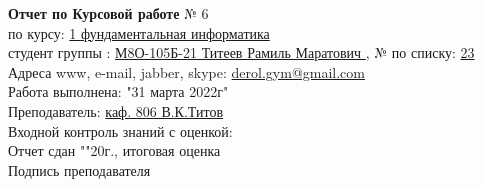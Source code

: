\documentclass[10pt]{report}
\begin{document}
    \begin{spacing}{1.7}
        \hspace{1.2in}
        \textbf {Отчет по Курсовой работе} № 6\\     %
        \indent \hspace{1.2in} по курсу: \underline{1 фундаментальная информатика } \\
        \indent \hspace{1.2in} студент группы : \underline{М8О-105Б-21 Титеев Рамиль Маратович }, № по списку: \underline{ 23 } \\
        \indent \hspace{1.2in} Адреса www, e-mail, jabber, skype: \underline{ derol.gym@gmail.com } \\
        \indent \hspace{1.2in} Работа выполнена: "31 марта 2022г" \\   %
        \indent \hspace{1.2in} Преподаватель: \underline{ каф. 806 В.К.Титов} \\
        \indent \hspace{1.2in} Входной контроль знаний с оценкой: \tlinee{2in} \\
        \indent \hspace{1.2in} Отчет сдан "\tlinee{0.2in}"\tlinee{1in}20\tlinee{0.2in}г., итоговая оценка \tlinee{1in}\\
        \indent \hspace{1.2in} Подпись преподавателя \tlinee{1.2in}\\
    \end{spacing}
    
\end{document}
